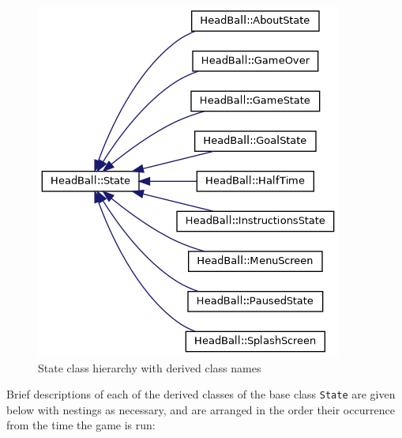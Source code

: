 \documentclass[main]{subfiles}
\begin{document}
\begin{figure}[H]
  \centering
  \includegraphics[scale=0.5]{graphics/UML_diagrams/state_hierarchy_brief}
  \caption{State class hierarchy with derived class names}
  \label{fig:state_hierarchy_classes}
\end{figure}

Brief descriptions of each of the derived classes of the base class \texttt{State} are given below with nestings as necessary, and are arranged in the order their occurrence from the time the game is run:
\end{document}
